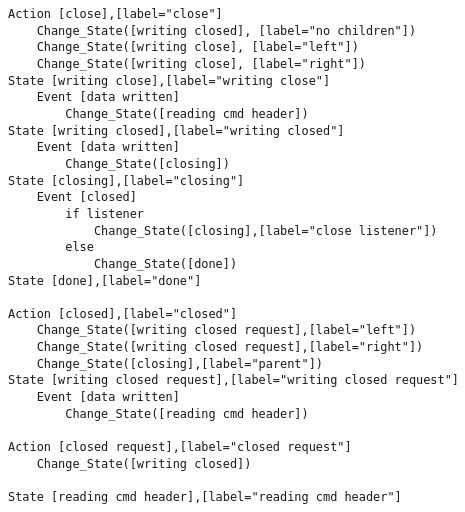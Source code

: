 \begin{comment}
This is the state machine for the smpd close commands.
Graph [smpd close],
      [size="7.5, 10"]
\end{comment}
\begin{verbatim}
Action [close],[label="close"]
	Change_State([writing closed], [label="no children"])
	Change_State([writing close], [label="left"])
	Change_State([writing close], [label="right"])
State [writing close],[label="writing close"]
	Event [data written]
		Change_State([reading cmd header])
State [writing closed],[label="writing closed"]
	Event [data written]
		Change_State([closing])
State [closing],[label="closing"]
	Event [closed]
		if listener
			Change_State([closing],[label="close listener"])
		else
			Change_State([done])
State [done],[label="done"]

Action [closed],[label="closed"]
	Change_State([writing closed request],[label="left"])
	Change_State([writing closed request],[label="right"])
	Change_State([closing],[label="parent"])
State [writing closed request],[label="writing closed request"]
	Event [data written]
		Change_State([reading cmd header])
		
Action [closed request],[label="closed request"]
	Change_State([writing closed])

State [reading cmd header],[label="reading cmd header"]
\end{verbatim}

